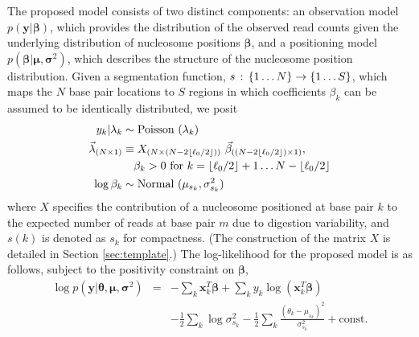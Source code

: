 The proposed model consists of two distinct components: an observation model $p(\bm y | \bm \beta)$, which provides the distribution of the observed read counts given the underlying distribution of nucleosome positions $\bm \beta$, and a positioning model $p(\bm \beta | \bm \mu, \bm \sigma^2)$, which describes the structure of the nucleosome position distribution.
%
Given a segmentation function, $s \,:\, \left\{1 \ldots N\right\} \rightarrow \left\{1 \ldots S\right\}$, which maps the $N$ base pair locations to $S$ regions in which coefficients $\beta_k$ can be assumed to be identically distributed, we posit
\begin{align}
 \label{eq:observation_model}
  y_k|\lambda_k         & \sim \hbox{Poisson } (\lambda_k) \\
 \label{eq:linear_model}
  \bm \lambda_{(N\times 1)} & \equiv X_{(N\times (N - 2 \lfloor \ell_0 / 2 \rfloor))} ~ \bm \beta_{((N - 2 \lfloor \ell_0 / 2 \rfloor)\times 1)}, \\
\nonumber & \quad \beta_k>0 \hbox{ for } k=\lfloor \ell_0 / 2 \rfloor + 1 \dots N - \lfloor \ell_0 / 2 \rfloor \\
\label{eq:positioning_model}
  \log \beta_k        & \sim \hbox{Normal } (\mu_{s_k},\sigma^2_{s_k})
\end{align}
where $X$ specifies the contribution of a nucleosome positioned at base pair $k$ to the expected number of reads at base pair $m$ due to digestion variability, and $s(k)$ is denoted as $s_k$ for compactness.
(The construction of the matrix $X$ is detailed in Section \ref{sec:template}.)
%
The log-likelihood for the proposed model is as follows, subject to the positivity constraint on $\bm \beta$,
\begin{eqnarray}
\label{eq:logLikelihood}
 \log p(\bm y | \bm \theta, \bm \mu, \bm \sigma^2) &=& -\sum_k
\bm x_k^T \bm \beta + \sum_k y_k \log \left( \bm x_k^T \bm \beta \right)  \\
 \nonumber && - \frac{1}{2} \sum_k \log \sigma^2_{s_k} -
  \frac{1}{2} \sum_k \frac{(\theta_k - \mu_{s_k})^2}{\sigma^2_{s_k}}
  + \mathrm{const}.
\end{eqnarray}

